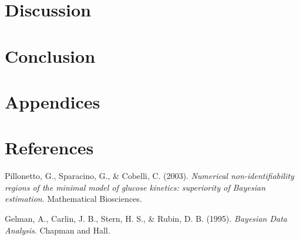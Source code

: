\documentclass[a4paper,10pt]{report}
\begin{document}
\section{Discussion}


\section{Conclusion}


\section*{Appendices}


\section*{References}
\begin{thebibliography}{9}

Pillonetto, G., Sparacino, G., \& Cobelli, C. (2003).
\textit{Numerical non-identifiability regions of the minimal model of glucose kinetics: superiority of Bayesian estimation}.
Mathematical Biosciences.

Gelman, A., Carlin, J. B., Stern, H. S., \& Rubin, D. B. (1995).
\textit{Bayesian Data Analysis}.
Chapman and Hall.

\end{thebibliography}
\end{document}
